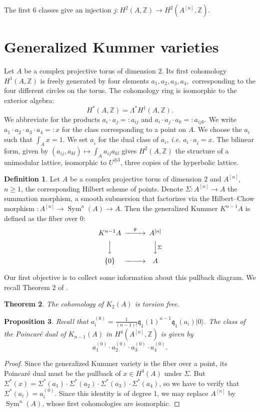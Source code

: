 \documentclass{amsart}
\DeclareMathOperator{\Sym}{Sym}
\newcommand{\hilb}[1]{^{[#1]}}
\newcommand{\ie}{{\it i.e. }}
\newcommand{\vac}{|0\rangle}
\newcommand{\pone}{ \mathfrak{p}_{ - 1} }
\newcommand{\kum}[2]{K_{ #2 }( #1 )}
\newcommand{\Z}{\mathbb{Z}}
\newcommand{\kq}{\mathfrak{q}}
\theoremstyle{plain}
\newtheorem{theorem}{Theorem}[section]
\newtheorem{proposition}[theorem]{Proposition}
\theoremstyle{definition}
\newtheorem{definition}[theorem]{Definition}
\theoremstyle{remark}
\begin{document}
The first $6$ classes give an injection $j : H^2(A,\Z)\rightarrow H^2(A\hilb{n},\Z)$. 

\section{Generalized Kummer varieties}
Let $A$ be a complex projective torus of dimension $2$. Its first cohomology $H^1(A,\Z)$ is freely generated by four elements $a_1,a_2,a_3,a_4,$ corresponding to the four different circles on the torus. The cohomology ring is isomorphic to the exterior algebra:
$$
H^*(A,\Z) = \Lambda^* H^1(A,\Z).
$$
We abbreviate for the products $a_i\cdot a_j =: a_{ij}$ and $a_i\cdot a_j\cdot a_k =: a_{ijk}$. We write $a_1\cdot a_2\cdot a_3 \cdot a_4 =:x$ for the class corresponding to a point on $A$. We choose the $a_i$ such that $\int_A x = 1$. We set $a_{\overline{i}}$ for the dual class of $a_i$, \ie  $a_i\cdot a_{\overline{i}} =x$.
The bilinear form, given by $(a_{ij},a_{kl})\mapsto\int_A a_{ij}a_{kl}$ gives $H^2(A,\Z)$ the structure of a unimodular lattice, isomorphic to $U^{\oplus 3}$, three copies of the hyperbolic lattice. 

\begin{definition}
Let $A$ be a complex projective torus of dimension $2$ and $A\hilb{n}$, $n\geq 1$, the corresponding Hilbert scheme of points. Denote $\Sigma : A\hilb{n} \rightarrow A$ the summation morphism, a smooth submersion that factorizes via the Hilbert--Chow morphism $: A\hilb{n}\rightarrow\Sym^n(A)\rightarrow A$. Then the generalized Kummer $K^{n-1} A $ is defined as the fiber over $0$:
\begin{equation}\label{square}
\begin{CD}
K^{n-1}A @>\theta >> A\hilb{n}\\
@VVV @VV\Sigma V\\
\{0\} @> >> A
\end{CD}
\end{equation}
\end{definition}
Our first objective is to collect some information about this pullback diagram. 
We recall Theorem 2 of \cite{Spanier}.
\begin{theorem}\label{torsion}
The cohomology of $K_{2}(A)$ is torsion free. 
\end{theorem}


\begin{proposition}
Recall that $a_i^{(0)}= \frac{1}{(n-1)!}\kq_{1}(1)^{n-1}\kq_1(a_i)\vac$. The class of the Poincar\'e dual of $\kum{A}{n-1}$ in $H^4(A\hilb{n},\Z)$ is given by
$$
a_1^{(0)}\cdot a_2^{(0)}\cdot a_3^{(0)}\cdot a_4^{(0)}.
$$ 
\end{proposition}
\begin{proof}
Since the generalized Kummer variety is the fiber over a point, its Poincar\'e dual must be the pullback of $x\in H^4(A)$ under $\Sigma$. But $\Sigma^* (x) = \Sigma^*(a_1)\cdot \Sigma^*(a_2)\cdot \Sigma^*(a_3)\cdot \Sigma^*(a_4)$, so we have to verify that $\Sigma^* (a_i) = a_i^{(0)}$. Since this identity is of degree 1, we may replace $A\hilb{n}$ by $\Sym^n(A)$, whose first cohomologies are isomorphic.
\end{proof}
\end{document}
